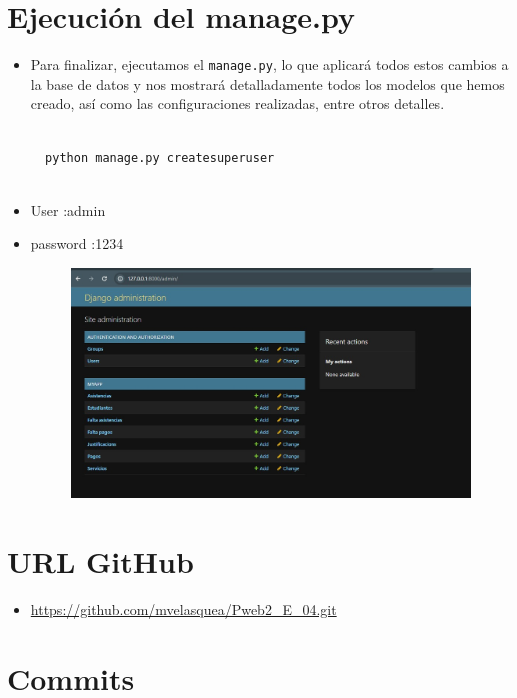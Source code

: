 \documentclass{article}
\begin{document}
	
	
   \section{Ejecución del manage.py}
\begin{itemize}
    \item Para finalizar, ejecutamos el \texttt{manage.py}, lo que aplicará todos estos cambios a la base de datos y nos mostrará detalladamente todos los modelos que hemos creado, así como las configuraciones realizadas, entre otros detalles.

  \begin{lstlisting}[language=Python, caption={Comando ara el manage.py}]
 
  python manage.py createsuperuser
  
    \end{lstlisting}
    
    \item User :admin
      \item password :1234
    
    \begin{figure}[H]
        \centering
        \includegraphics[scale=0.4]{img/Basedatos_final.jpeg}
    \end{figure}
\end{itemize}

	
	\section{URL GitHub }
	\begin{itemize}
		\item \url{https://github.com/mvelasquea/Pweb2_E_04.git}
	\end{itemize}
	\section{Commits }
	
\end{document}
